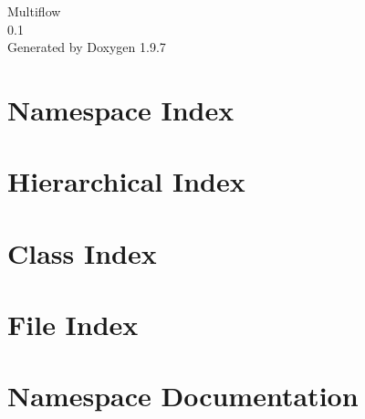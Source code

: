 \documentclass[twoside]{book}
\newcommand{\+}{\discretionary{\mbox{\scriptsize$\hookleftarrow$}}{}{}}
\newcommand{\clearemptydoublepage}{%
    \newpage{\pagestyle{empty}\cleardoublepage}%
  }
\begin{document}
  \raggedbottom
    \hypersetup{pageanchor=false,
                bookmarksnumbered=true,
                pdfencoding=unicode
               }
  \begin{titlepage}
  \vspace*{7cm}
  \begin{center}%
  {\Large Multiflow}\\
  [1ex]\large 0.\+1 \\
  \vspace*{1cm}
  {\large Generated by Doxygen 1.9.7}\\
  \end{center}
  \end{titlepage}
  \clearemptydoublepage
  \tableofcontents
  \clearemptydoublepage
  \hypersetup{pageanchor=true}

\chapter{Namespace Index}

\chapter{Hierarchical Index}

\chapter{Class Index}

\chapter{File Index}

\chapter{Namespace Documentation}








\end{document}
